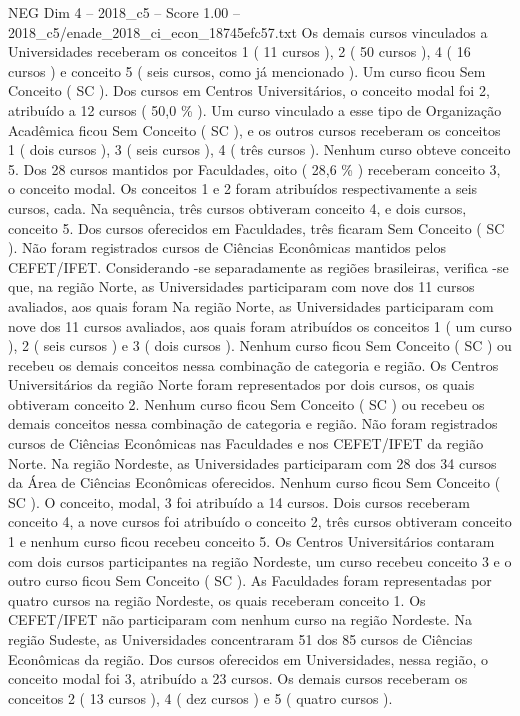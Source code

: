 \begin{textsample}{NEG Dim 4 – 2018\_c5 – Score 1.00 – 2018\_c5/enade\_2018\_ci\_econ\_18745efc57.txt}
Os demais cursos vinculados a Universidades receberam os conceitos 1 ( 11 cursos ), 2 ( 50 cursos ), 4 ( 16 cursos ) e conceito 5 ( seis cursos, como já mencionado ).
Um curso ficou Sem Conceito ( SC ).
Dos cursos em Centros Universitários, o conceito modal foi 2, atribuído a 12 cursos ( 50,0 \% ).
Um curso vinculado a esse tipo de Organização Acadêmica ficou Sem Conceito ( SC ), e os outros cursos receberam os conceitos 1 ( dois cursos ), 3 ( seis cursos ), 4 ( três cursos ).
Nenhum curso obteve conceito 5.
Dos 28 cursos mantidos por Faculdades, oito ( 28,6 \% ) receberam conceito 3, o conceito modal.
Os conceitos 1 e 2 foram atribuídos respectivamente a seis cursos, cada.
Na sequência, três cursos obtiveram conceito 4, e dois cursos, conceito 5.
Dos cursos oferecidos em Faculdades, três ficaram Sem Conceito ( SC ).
Não foram registrados cursos de Ciências Econômicas mantidos pelos CEFET/IFET.
Considerando -se separadamente as regiões brasileiras, verifica -se que, na região Norte, as Universidades participaram com nove dos 11 cursos avaliados, aos quais foram Na região Norte, as Universidades participaram com nove dos 11 cursos avaliados, aos quais foram atribuídos os conceitos 1 ( um curso ), 2 ( seis cursos ) e 3 ( dois cursos ).
Nenhum curso ficou Sem Conceito ( SC ) ou recebeu os demais conceitos nessa combinação de categoria e região.
Os Centros Universitários da região Norte foram representados por dois cursos, os quais obtiveram conceito 2.
Nenhum curso ficou Sem Conceito ( SC ) ou recebeu os demais conceitos nessa combinação de categoria e região.
Não foram registrados cursos de Ciências Econômicas nas Faculdades e nos CEFET/IFET da região Norte.
Na região Nordeste, as Universidades participaram com 28 dos 34 cursos da Área de Ciências Econômicas oferecidos.
Nenhum curso ficou Sem Conceito ( SC ).
O conceito, modal, 3 foi atribuído a 14 cursos.
Dois cursos receberam conceito 4, a nove cursos foi atribuído o conceito 2, três cursos obtiveram conceito 1 e nenhum curso ficou recebeu conceito 5.
Os Centros Universitários contaram com dois cursos participantes na região Nordeste, um curso recebeu conceito 3 e o outro curso ficou Sem Conceito ( SC ).
As Faculdades foram representadas por quatro cursos na região Nordeste, os quais receberam conceito 1.
Os CEFET/IFET não participaram com nenhum curso na região Nordeste.
Na região Sudeste, as Universidades concentraram 51 dos 85 cursos de Ciências Econômicas da região.
Dos cursos oferecidos em Universidades, nessa região, o conceito modal foi 3, atribuído a 23 cursos.
Os demais cursos receberam os conceitos 2 ( 13 cursos ), 4 ( dez cursos ) e 5 ( quatro cursos ).

\end{textsample}
